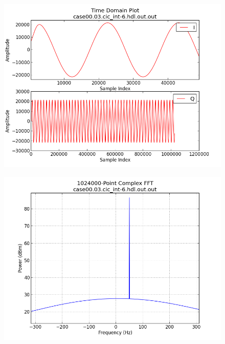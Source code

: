\documentclass{article}
\def\importpath{../../cic_dec.test/doc/}
\begin{document}
	\begin{figure}[ht]
		\centering
		\begin{minipage}{.5\textwidth}
			\centering\includegraphics[width=1.0\linewidth]{output_time_R2048}
			\label{fig:output_time_R2048}
		\end{minipage}%
		\begin{minipage}{.5\textwidth}
			\centering\includegraphics[width=1.0\linewidth]{output_freq_R2048}
			\label{fig:output_freq_R2048}
		\end{minipage}
	\end{figure}


\end{document}
